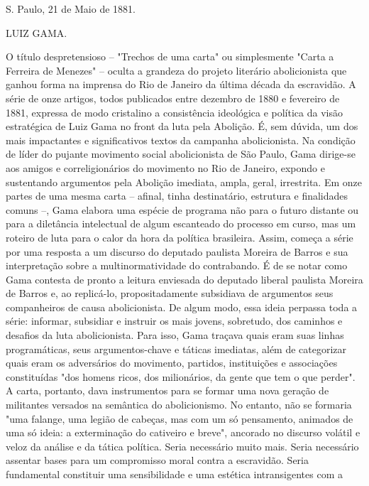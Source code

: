 S. Paulo, 21 de Maio de 1881.

LUIZ GAMA.

\pagebreak
\mbox{}\vfill
\thispagestyle{empty}

{\small\noindent
O título despretensioso -- "Trechos de uma carta" ou simplesmente
"Carta a Ferreira de Menezes" -- oculta a grandeza do projeto literário
abolicionista que ganhou forma na imprensa do Rio de Janeiro da última
década da escravidão. A série de onze artigos, todos publicados entre
dezembro de 1880 e fevereiro de 1881, expressa de modo cristalino a
consistência ideológica e política da visão estratégica de Luiz Gama no
front da luta pela Abolição. É, sem dúvida, um dos mais impactantes e
significativos textos da campanha abolicionista. Na condição de líder do
pujante movimento social abolicionista de São Paulo, Gama dirige-se aos
amigos e correligionários do movimento no Rio de Janeiro, expondo e
sustentando argumentos pela Abolição imediata, ampla, geral, irrestrita.
Em onze partes de uma mesma carta -- afinal, tinha destinatário,
estrutura e finalidades comuns --, Gama elabora uma espécie de programa
não para o futuro distante ou para a diletância intelectual de algum
escanteado do processo em curso, mas um roteiro de luta para o calor da
hora da política brasileira. Assim, começa a série por uma resposta a um
discurso do deputado paulista Moreira de Barros e sua interpretação
sobre a multinormatividade do contrabando. É de se notar como Gama
contesta de pronto a leitura enviesada do deputado liberal paulista
Moreira de Barros e, ao replicá-lo, propositadamente subsidiava de
argumentos seus companheiros de causa abolicionista. De algum modo, essa
ideia perpassa toda a série: informar, subsidiar e instruir os mais
jovens, sobretudo, dos caminhos e desafios da luta abolicionista. Para
isso, Gama traçava quais eram suas linhas programáticas, seus
argumentos-chave e táticas imediatas, além de categorizar quais eram os
adversários do movimento, partidos, instituições e associações
constituídas "dos homens ricos, dos milionários, da gente que tem o que
perder". A carta, portanto, dava instrumentos para se formar uma nova
geração de militantes versados na semântica do abolicionismo. No
entanto, não se formaria "uma falange, uma legião de cabeças, mas com um
só pensamento, animados de uma só ideia: a exterminação do cativeiro e
breve", ancorado no discurso volátil e veloz da análise e da tática
política. Seria necessário muito mais. Seria necessário assentar bases
para um compromisso moral contra a escravidão. Seria fundamental
constituir uma sensibilidade e uma estética intransigentes com a
}
